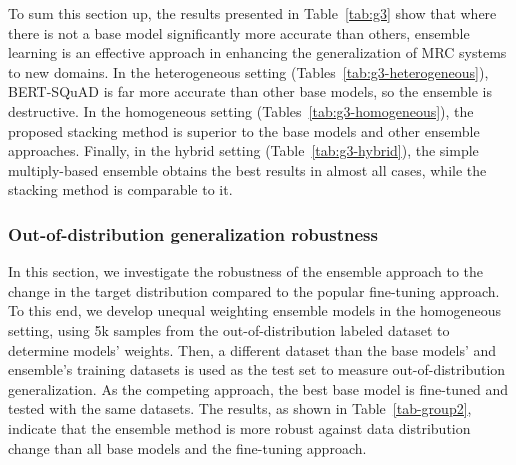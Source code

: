 \documentclass[review]{elsarticle}
\begin{document}
 To sum this section up, the results presented in Table~\ref{tab:g3} show that where there is not a base model significantly more accurate than others, ensemble learning is an effective approach in enhancing the generalization of MRC systems to new domains. In the heterogeneous setting (Tables~\ref{tab:g3-heterogeneous}), BERT-SQuAD is far more accurate than other base models, so the ensemble is destructive. In the homogeneous setting (Tables~\ref{tab:g3-homogeneous}), the proposed stacking method is superior to the base models and other ensemble approaches. Finally, in the hybrid setting (Table~\ref{tab:g3-hybrid}), the simple multiply-based ensemble obtains the best results in almost all cases, while the stacking method is comparable to it.

\subsubsection{Out-of-distribution generalization robustness}
In this section, we investigate the robustness of the ensemble approach to the change in the target distribution compared to the popular fine-tuning approach. To this end, we develop unequal weighting ensemble models in the homogeneous setting, using 5k samples from the out-of-distribution labeled dataset to determine models' weights. Then, a different dataset than the base models' and ensemble's training datasets is used as the test set to measure out-of-distribution generalization. As the competing approach, the best base model is fine-tuned and tested with the same datasets. The results, as shown in Table~\ref{tab-group2}, indicate that the ensemble method is more robust against data distribution change than all base models and the fine-tuning approach. 
\end{document}
